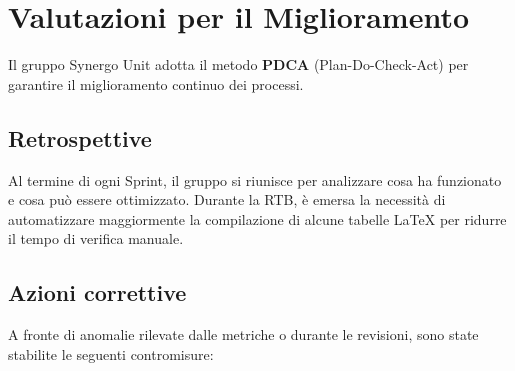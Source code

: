 \newpage
\section{Valutazioni per il Miglioramento}
Il gruppo Synergo Unit adotta il metodo \textbf{PDCA} (Plan-Do-Check-Act) per garantire il miglioramento continuo dei processi.

\subsection{Retrospettive}
Al termine di ogni Sprint, il gruppo si riunisce per analizzare cosa ha funzionato e cosa può essere ottimizzato. Durante la RTB, è emersa la necessità di automatizzare maggiormente la compilazione di alcune tabelle LaTeX per ridurre il tempo di verifica manuale.

\subsection{Azioni correttive}
A fronte di anomalie rilevate dalle metriche o durante le revisioni, sono state stabilite le seguenti contromisure:

